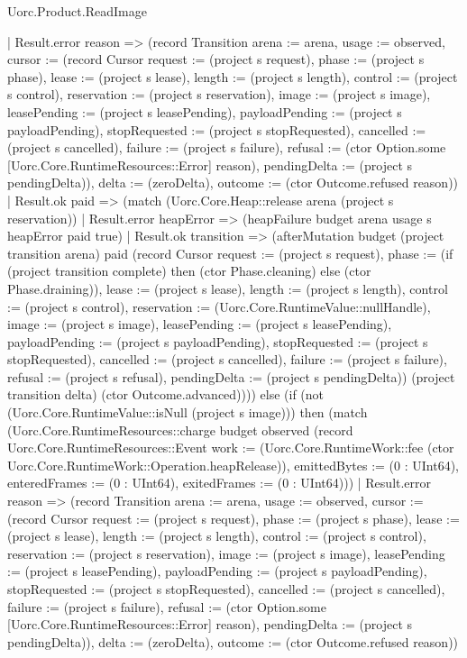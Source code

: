 \begin{lexlean}{Uorc.Product.ReadImage}
\begin{semanticmodule}
{          | Result.error reason => (record Transition {arena := arena, usage := observed, cursor := (record Cursor {request := (project s request), phase := (project s phase), lease := (project s lease), length := (project s length), control := (project s control), reservation := (project s reservation), image := (project s image), leasePending := (project s leasePending), payloadPending := (project s payloadPending), stopRequested := (project s stopRequested), cancelled := (project s cancelled), failure := (project s failure), refusal := (ctor Option.some [Uorc.Core.RuntimeResources::Error] reason), pendingDelta := (project s pendingDelta)}), delta := (zeroDelta), outcome := (ctor Outcome.refused reason)})
          | Result.ok paid => (match (Uorc.Core.Heap::release arena (project s reservation))
            | Result.error heapError => (heapFailure budget arena usage s heapError paid true)
            | Result.ok transition => (afterMutation budget (project transition arena) paid (record Cursor {request := (project s request), phase := (if (project transition complete) then (ctor Phase.cleaning) else (ctor Phase.draining)), lease := (project s lease), length := (project s length), control := (project s control), reservation := (Uorc.Core.RuntimeValue::nullHandle), image := (project s image), leasePending := (project s leasePending), payloadPending := (project s payloadPending), stopRequested := (project s stopRequested), cancelled := (project s cancelled), failure := (project s failure), refusal := (project s refusal), pendingDelta := (project s pendingDelta)}) (project transition delta) (ctor Outcome.advanced)))) else (if (not (Uorc.Core.RuntimeValue::isNull (project s image))) then (match (Uorc.Core.RuntimeResources::charge budget observed (record Uorc.Core.RuntimeResources::Event {work := (Uorc.Core.RuntimeWork::fee (ctor Uorc.Core.RuntimeWork::Operation.heapRelease)), emittedBytes := (0 : UInt64), enteredFrames := (0 : UInt64), exitedFrames := (0 : UInt64)}))
          | Result.error reason => (record Transition {arena := arena, usage := observed, cursor := (record Cursor {request := (project s request), phase := (project s phase), lease := (project s lease), length := (project s length), control := (project s control), reservation := (project s reservation), image := (project s image), leasePending := (project s leasePending), payloadPending := (project s payloadPending), stopRequested := (project s stopRequested), cancelled := (project s cancelled), failure := (project s failure), refusal := (ctor Option.some [Uorc.Core.RuntimeResources::Error] reason), pendingDelta := (project s pendingDelta)}), delta := (zeroDelta), outcome := (ctor Outcome.refused reason)})
}
\end{semanticmodule}
\end{lexlean}
